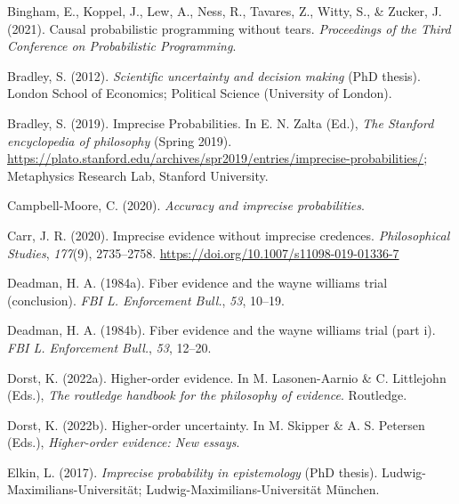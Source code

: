 \documentclass[
  10pt,
  dvipsnames,enabledeprecatedfontcommands]{scrartcl}
\newlength{\cslhangindent}
\newlength{\cslentryspacingunit} %
\newenvironment{CSLReferences}[2] %
 {%
  \setlength{\parindent}{0pt}
  \ifodd #1
  \let\oldpar\par
  \def\par{\hangindent=\cslhangindent\oldpar}
  \fi
  \setlength{\parskip}{#2\cslentryspacingunit}
 }%
 {}
\begin{document}
\hypertarget{refs}{}
\begin{CSLReferences}{1}{0}
\leavevmode{}%
Bingham, E., Koppel, J., Lew, A., Ness, R., Tavares, Z., Witty, S., \&
Zucker, J. (2021). Causal probabilistic programming without tears.
\emph{Proceedings of the Third Conference on Probabilistic Programming}.

\leavevmode{}%
Bradley, S. (2012). \emph{Scientific uncertainty and decision making}
(PhD thesis). London School of Economics; Political Science (University
of London).

\leavevmode{}%
Bradley, S. (2019). {Imprecise Probabilities}. In E. N. Zalta (Ed.),
\emph{The {Stanford} encyclopedia of philosophy} ({S}pring 2019).
\url{https://plato.stanford.edu/archives/spr2019/entries/imprecise-probabilities/};
Metaphysics Research Lab, Stanford University.

\leavevmode{}%
Campbell-Moore, C. (2020). \emph{Accuracy and imprecise probabilities}.

\leavevmode{}%
Carr, J. R. (2020). Imprecise evidence without imprecise credences.
\emph{Philosophical Studies}, \emph{177}(9), 2735--2758.
\url{https://doi.org/10.1007/s11098-019-01336-7}

\leavevmode{}%
Deadman, H. A. (1984a). Fiber evidence and the wayne williams trial
(conclusion). \emph{FBI L. Enforcement Bull.}, \emph{53}, 10--19.

\leavevmode{}%
Deadman, H. A. (1984b). Fiber evidence and the wayne williams trial
(part i). \emph{FBI L. Enforcement Bull.}, \emph{53}, 12--20.

\leavevmode{}%
Dorst, K. (2022a). Higher-order evidence. In M. Lasonen-Aarnio \& C.
Littlejohn (Eds.), \emph{The routledge handbook for the philosophy of
evidence}. Routledge.

\leavevmode{}%
Dorst, K. (2022b). Higher-order uncertainty. In M. Skipper \& A. S.
Petersen (Eds.), \emph{Higher-order evidence: New essays}.

\leavevmode{}%
Elkin, L. (2017). \emph{Imprecise probability in epistemology} (PhD
thesis). Ludwig-Maximilians-Universit{ä}t;
Ludwig-Maximilians-Universität München.


\end{CSLReferences}
\end{document}
